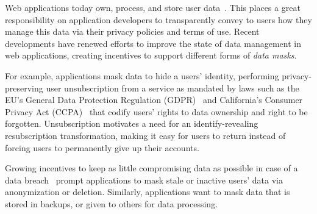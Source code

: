 


\iffalse
Web applications today own, process, and store user data~\cite{nytimes:fb, npr:data}. This places a
great responsibility on application developers to transparently convey to users how they manage this
data via their privacy policies and terms of use.
%
Recent developments have renewed efforts to improve the state of data management in web
applications, creating incentives to support different forms of \emph{data masks}.

For example, applications mask data to hide a users' identity, performing privacy-preserving user
unsubscription from a service as mandated by laws such as the EU's General Data Protection
Regulation (GDPR)~\cite{eu:gdpr} and California's Consumer Privacy Act (CCPA)~\cite{ca:privacy-act}
that codify users' rights to data ownership and right to be forgotten. Unsubscription motivates a
need for an identify-revealing resubscription transformation, making it easy for users to return
instead of forcing users to permanently give up their accounts.

Growing incentives to keep as little compromising data as possible in case of a data
breach~\cite{breach:amazon,breach:twitter, breach:fb, breach:marriott, breach:quora} prompt
applications to mask stale or inactive users' data via anonymization or deletion. Similarly,
applications want to mask data that is stored in backups, or given to others for data processing.


